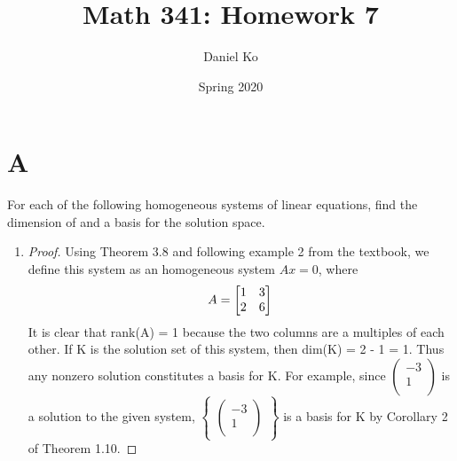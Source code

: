 \documentclass[11pt]{scrartcl}
\title{Math 341: Homework 7}
\author{Daniel Ko}
\date{Spring 2020}
\begin{document}
\maketitle

\section{A}
For each of the following homogeneous systems of linear equations, find the dimension of and a basis for the
solution space.

\begin{enumerate}[label=\alph*.]
	\item{
		\begin{proof}
			Using Theorem 3.8 and following example 2 from the textbook, we define this system as an homogeneous system $Ax=0$, where 
			\[
				A=
			\begin{bmatrix}
				1 & 3\\
				2 & 6\\
			\end{bmatrix}\\
			\]
			It is clear that rank(A) = 1 because the two columns are a multiples of each other. 
			If K is	the solution set of this system, then dim(K) = 2 - 1 = 1. 
			Thus any nonzero solution constitutes a basis for K. For example, since
			$
			\begin{pmatrix}
				-3\\
				1\\
			\end{pmatrix}
			$
			is a solution to the given system,
			$
			\begin{Bmatrix}
				\begin{pmatrix}
					-3\\
					1\\
				\end{pmatrix}
			\end{Bmatrix}
			$ 
			is a basis for K by Corollary 2 of Theorem 1.10.
		\end{proof}
	}


\end{enumerate}
\end{document}
